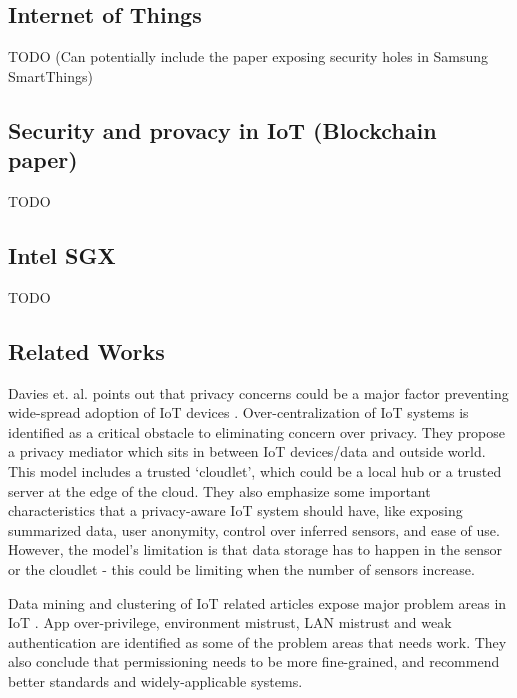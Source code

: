 \subsection{Internet of Things}
TODO
(Can potentially include the paper exposing security holes in Samsung SmartThings)

\subsection{Security and provacy in IoT (Blockchain paper)}
TODO

\subsection{Intel SGX}
TODO

\subsection{Related Works}
Davies et. al. points out that privacy concerns could be a major factor preventing wide-spread adoption of IoT devices \cite{davies}. Over-centralization of IoT systems is identified as a critical obstacle to eliminating concern over privacy. They propose a privacy mediator which sits in between IoT devices/data and outside world. This model includes a trusted `cloudlet', which could be a local hub or a trusted server at the edge of the cloud. They also emphasize some important characteristics that a privacy-aware IoT system should have, like exposing summarized data, user anonymity, control over inferred sensors, and ease of use. However, the model's limitation is that data storage has to happen in the sensor or the cloudlet - this could be limiting when the number of sensors increase.

Data mining and clustering of IoT related articles expose major problem areas in IoT \cite{zhang}. App over-privilege, environment mistrust, LAN mistrust and weak authentication are identified as some of the problem areas that needs work. They also conclude that permissioning needs to be more fine-grained, and recommend better standards and widely-applicable systems.